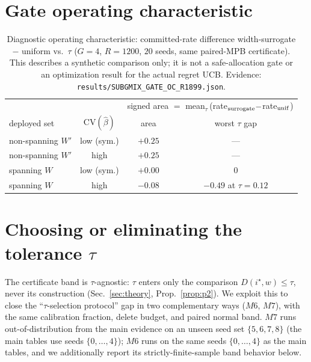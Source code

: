 \documentclass{article}
\begin{document}
\section{Gate operating characteristic}
\label{app:gateoc}
\begin{table}[h]
\centering\small\setlength{\tabcolsep}{4pt}
\begin{tabular}{lccc}
\toprule
& & \multicolumn{2}{c}{signed area $=$ mean$_\tau$\,(rate$_{\rm surrogate}-$rate$_{\rm unif}$)} \\
deployed set & $\mathrm{CV}(\hat\beta)$ & area & worst $\tau$ gap \\
\midrule
non-spanning $W'$ & low (sym.) & $+0.25$ & --- \\
non-spanning $W'$ & high & $+0.25$ & --- \\
spanning $W$ & low (sym.) & $+0.00$ & $0$ \\
spanning $W$ & high & $-0.08$ & $-0.49$ at $\tau{=}0.12$ \\
\bottomrule
\end{tabular}
\caption{Diagnostic operating characteristic: committed-rate difference width-surrogate $-$
uniform vs.\ $\tau$ ($G{=}4$, $R{=}1200$, $20$ seeds, same paired-MPB certificate). This
describes a synthetic comparison only; it is not a safe-allocation gate or an optimization
result for the actual regret UCB. Evidence:
\texttt{results/SUBGMIX\_GATE\_OC\_R1899.json}.}
\label{tab:gateoc}
\end{table}

\section{Choosing or eliminating the tolerance $\tau$}
\label{app:tau}
The certificate band is $\tau$-agnostic: $\tau$ enters only the comparison
$D(i^\star,w)\le\tau$, never its construction (Sec.~\ref{sec:theory}, Prop.~\ref{prop:p2}).
We exploit this to close the ``$\tau$-selection protocol'' gap in two complementary ways
($M6$, $M7$), with the same calibration fraction, delete budget, and paired normal band.
$M7$ runs out-of-distribution from the main evidence on an unseen seed set
$\{5,6,7,8\}$ (the main tables use seeds $\{0,\dots,4\}$); $M6$ runs on the same seeds
$\{0,\dots,4\}$ as the main tables, and we additionally report its strictly-finite-sample
band behavior below.
\end{document}
